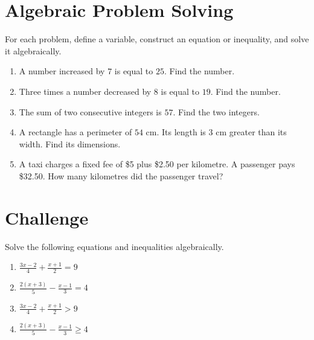 	\begin{minipage}[t]{0.66\textwidth}
		
		\section{Algebraic Problem Solving}
		
		For each problem, define a variable, construct an equation or inequality, and solve it algebraically.
		
		\begin{enumerate}
			\item
			A number increased by $7$ is equal to $25$. Find the number.
			
			\item
			Three times a number decreased by $8$ is equal to $19$. Find the number.
			
			\item
			The sum of two consecutive integers is $57$. Find the two integers.
			
			\item
			A rectangle has a perimeter of $54$ cm. Its length is $3$ cm greater than its width. Find its dimensions.
			
			\item
			A taxi charges a fixed fee of \$5 plus \$2.50 per kilometre.
			A passenger pays \$32.50. How many kilometres did the passenger travel?
		\end{enumerate}
		
	\end{minipage}
	\hfill
	\begin{minipage}[t]{0.3\textwidth}
		
		\section{Challenge}
		
		Solve the following equations and inequalities algebraically.
		
		\begin{enumerate}
			\item $\frac{3x-2}{4}+\frac{x+1}{2}=9$
			
			\item $\frac{2(x+3)}{5}-\frac{x-1}{3}=4$
			
			\item $\frac{3x-2}{4}+\frac{x+1}{2}>9$
			
			\item $\frac{2(x+3)}{5}-\frac{x-1}{3}\geq4$
		\end{enumerate}
		
	\end{minipage}
	
